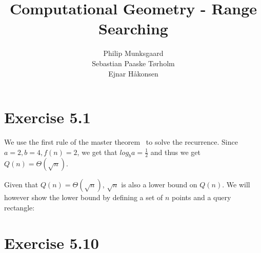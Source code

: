 \documentclass[11pt,a4paper]{article}
\title{Computational Geometry - Range Searching}
\author{Philip Munksgaard \\ Sebastian Paaske Tørholm \\ Ejnar Håkonsen}
\begin{document}
\maketitle

\section{Exercise 5.1}

We use the first rule of the master theorem~\cite{Cormen theorem 4.1}
to solve the recurrence. Since $a=2, b=4, f(n)=2$, we get that $log_ba
= \frac{1}{2}$ and thus we get $Q(n) = \Theta(\sqrt{n})$.

Given that $Q(n) = \Theta(\sqrt{n})$, $\sqrt{n}$ is also a lower
bound on $Q(n)$. We will however show the lower bound by defining a
set of $n$ points and a query rectangle:

\section{Exercise 5.10}
\end{document}
